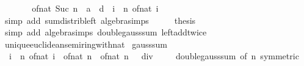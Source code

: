 \begin{isabellebody}
\ \ \isamarkupfalse%
\ \isamarkupfalse%
\ {\isachardoublequoteopen}{\isasymdots}\ {\isacharequal}{\kern0pt}\ {\isacharparenleft}{\kern0pt}of{\isacharunderscore}{\kern0pt}nat\ {\isacharparenleft}{\kern0pt}Suc\ n{\isacharparenright}{\kern0pt}\ {\isacharasterisk}{\kern0pt}\ a\ {\isacharplus}{\kern0pt}\ d\ {\isacharasterisk}{\kern0pt}\ {\isacharparenleft}{\kern0pt}{\isasymSum}i\ {\isacharequal}{\kern0pt}\ {}{\isachardot}{\kern0pt}{\isachardot}{\kern0pt}n{\isachardot}{\kern0pt}\ of{\isacharunderscore}{\kern0pt}nat\ i{\isacharparenright}{\kern0pt}{\isacharparenright}{\kern0pt}{\isachardoublequoteclose}\isanewline
\ \ \ \ \isamarkupfalse%
\ {\isacharparenleft}{\kern0pt}simp\ add{\isacharcolon}{\kern0pt}\ sum{\isacharunderscore}{\kern0pt}distrib{\isacharunderscore}{\kern0pt}left\ algebra{\isacharunderscore}{\kern0pt}simps{\isacharparenright}{\kern0pt}\isanewline
\ \ \isamarkupfalse%
\ \isamarkupfalse%
\ {\isacharquery}{\kern0pt}thesis\isanewline
\ \ \ \ \isamarkupfalse%
\ {\isacharparenleft}{\kern0pt}simp\ add{\isacharcolon}{\kern0pt}\ algebra{\isacharunderscore}{\kern0pt}simps\ double{\isacharunderscore}{\kern0pt}gauss{\isacharunderscore}{\kern0pt}sum\ left{\isacharunderscore}{\kern0pt}add{\isacharunderscore}{\kern0pt}twice{\isacharparenright}{\kern0pt}\isanewline
{}\isamarkupfalse%
%
\endisatagproof
{\isafoldproof}%
%
\isadelimproof
\isanewline
%
\endisadelimproof
\isanewline
{}\isamarkupfalse%
\isanewline
\isanewline
{}\isamarkupfalse%
\ unique{\isacharunderscore}{\kern0pt}euclidean{\isacharunderscore}{\kern0pt}semiring{\isacharunderscore}{\kern0pt}with{\isacharunderscore}{\kern0pt}nat\isanewline
{}\isanewline
\isanewline
{}\isamarkupfalse%
\ gauss{\isacharunderscore}{\kern0pt}sum{\isacharcolon}{\kern0pt}\isanewline
\ \ {\isachardoublequoteopen}{\isacharparenleft}{\kern0pt}{\isasymSum}i\ {\isacharequal}{\kern0pt}\ {}{\isachardot}{\kern0pt}{\isachardot}{\kern0pt}n{\isachardot}{\kern0pt}\ of{\isacharunderscore}{\kern0pt}nat\ i{\isacharparenright}{\kern0pt}\ {\isacharequal}{\kern0pt}\ of{\isacharunderscore}{\kern0pt}nat\ n\ {\isacharasterisk}{\kern0pt}\ {\isacharparenleft}{\kern0pt}of{\isacharunderscore}{\kern0pt}nat\ n\ {\isacharplus}{\kern0pt}\ {}{\isacharparenright}{\kern0pt}\ div\ {}{\isachardoublequoteclose}\isanewline
%
\isadelimproof
\ \ %
\endisadelimproof
%
\isatagproof
{}\isamarkupfalse%
\ double{\isacharunderscore}{\kern0pt}gauss{\isacharunderscore}{\kern0pt}sum\ {\isacharbrackleft}{\kern0pt}of\ n{\isacharcomma}{\kern0pt}\ symmetric{\isacharbrackright}{\kern0pt}\ \isamarkupfalse%

\end{isabellebody}
